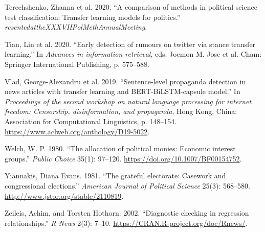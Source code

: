 \documentclass[12pt,]{article}
\begin{document}
\leavevmode\hypertarget{ref-terechshenko2020}{}%
Terechshenko, Zhanna et al. 2020. ``A comparison of methods in political
science test classification: Transfer learning models for politics.''
\emph{resentedattheXXXVIIPolMethAnnualMeeting}.

\leavevmode\hypertarget{ref-tian2020}{}%
Tian, Lin et al. 2020. ``Early detection of rumours on twitter via
stance transfer learning.'' In \emph{Advances in information retrieval},
eds. Joemon M. Jose et al. Cham: Springer International Publishing, p.
575--588.

\leavevmode\hypertarget{ref-vlad2019}{}%
Vlad, George-Alexandru et al. 2019. ``Sentence-level propaganda
detection in news articles with transfer learning and
BERT-BiLSTM-capsule model.'' In \emph{Proceedings of the second workshop
on natural language processing for internet freedom: Censorship,
disinformation, and propaganda}, Hong Kong, China: Association for
Computational Linguistics, p. 148--154.
\url{https://www.aclweb.org/anthology/D19-5022}.

\leavevmode\hypertarget{ref-welch1980}{}%
Welch, W. P. 1980. ``The allocation of political monies: Economic
interest groups.'' \emph{Public Choice} 35(1): 97--120.
\url{https://doi.org/10.1007/BF00154752}.

\leavevmode\hypertarget{ref-yiannakis1981}{}%
Yiannakis, Diana Evans. 1981. ``The grateful electorate: Casework and
congressional elections.'' \emph{American Journal of Political Science}
25(3): 568--580. \url{http://www.jstor.org/stable/2110819}.

\leavevmode\hypertarget{ref-lmtest}{}%
Zeileis, Achim, and Torsten Hothorn. 2002. ``Diagnostic checking in
regression relationships.'' \emph{R News} 2(3): 7--10.
\url{https://CRAN.R-project.org/doc/Rnews/}.





\newpage
\singlespacing 
\end{document}
